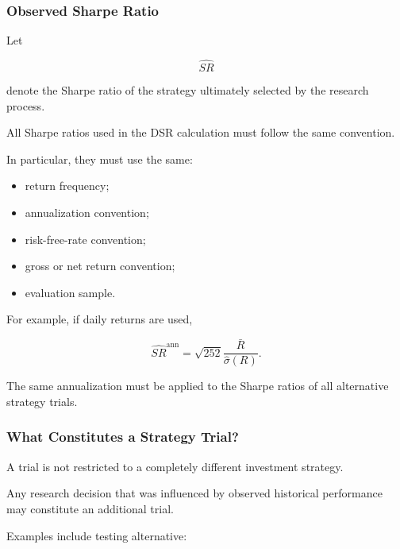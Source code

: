 \documentclass[11pt,a4paper]{article}
\begin{document}
\subsubsection{Observed Sharpe Ratio}

Let

\begin{equation}
\widehat{SR}
\end{equation}

denote the Sharpe ratio of the strategy ultimately selected by the research
process.

All Sharpe ratios used in the DSR calculation must follow the same convention.

In particular, they must use the same:

\begin{itemize}
    \item return frequency;
    \item annualization convention;
    \item risk-free-rate convention;
    \item gross or net return convention;
    \item evaluation sample.
\end{itemize}

For example, if daily returns are used,

\begin{equation}
\widehat{SR}^{\mathrm{ann}}
=
\sqrt{252}
\frac{
\bar{R}
}{
\widehat{\sigma}(R)
}.
\end{equation}

The same annualization must be applied to the Sharpe ratios of all alternative
strategy trials.


\subsubsection{What Constitutes a Strategy Trial?}

A trial is not restricted to a completely different investment strategy.

Any research decision that was influenced by observed historical performance
may constitute an additional trial.

Examples include testing alternative:
\end{document}
